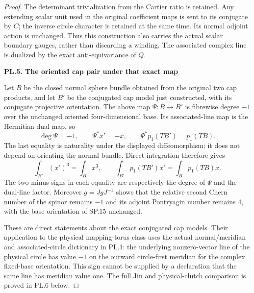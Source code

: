 \begin{proof}
The determinant trivialization from the Cartier ratio is retained.
Any extending scalar unit used in the original coefficient maps is
sent to its conjugate by \(C\); the inverse circle character is retained
at the same time. Its normal adjoint action is unchanged. Thus this
construction also carries the actual scalar boundary gauges, rather
than discarding a winding. The associated complex line is dualized by
the exact anti-equivariance of \(Q\).

\par

\medskip\noindent\textbf{PL.5. The oriented cap pair under that exact map}

\par\nopagebreak[4]

Let \(B\) be the closed normal sphere bundle obtained from the original
two cap products, and let \(B'\) be the conjugated cap model just
constructed, with its conjugate projective orientation. The above
map \(\Psi:B\longrightarrow B'\) is fibrewise degree \(-1\) over the
unchanged oriented four-dimensional base. Its associated-line map is
the Hermitian dual map, so
\[
 \deg\Psi=-1,\qquad \Psi^*x'=-x,
 \qquad \Psi^*p_1(TB')=p_1(TB).
\]
The last equality is naturality under the displayed diffeomorphism;
it does not depend on orienting the normal bundle. Direct integration
therefore gives
\[
 \int_{B'}(x')^3=\int_Bx^3,
 \qquad
 \int_{B'}p_1(TB')x'=\int_Bp_1(TB)x.
\]
The two minus signs in each equality are respectively the degree of
\(\Psi\) and the dual-line factor. Moreover \(\overline g=JgJ^{-1}\)
shows that the relative second Chern number of the spinor remains
\(-1\) and its adjoint Pontryagin number remains \(4\), with the
base orientation of SP.15 unchanged.

These are direct statements about the exact conjugated cap models.
Their application to the physical mapping-torus class uses
the actual normal/meridian and associated-circle dictionary in PL.1:
the underlying nonzero-vector line of the physical circle has value
\(-1\) on the outward circle-first meridian for the complex fixed-base
orientation. This sign cannot be supplied by a declaration that the
same line has meridian value one. The full Jin and physical-clutch comparison is proved in PL.6 below.


\end{proof}
